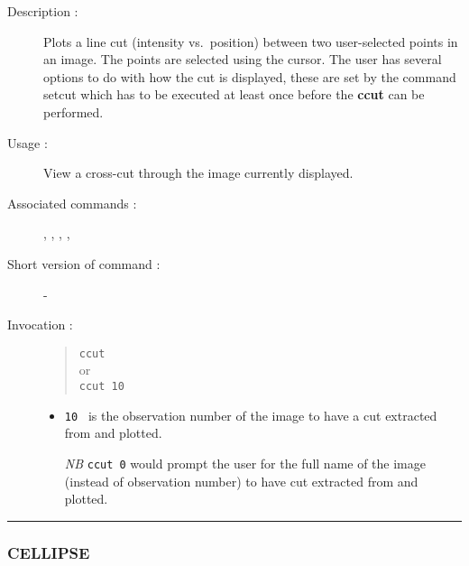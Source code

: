 \begin{description}

\item[Description :] Plots a line cut (intensity vs.\ position) between two
user-selected points in an image.  The points are selected using the
cursor.  The user has several options to do with how the cut is
displayed, these are set by the command setcut which has to be executed
at least once before the {\bf ccut} can be performed.

\item[Usage :] View a cross-cut through the image currently displayed.
\item[Associated commands :] {\tt {}},
{\tt {}}, {\tt {}},
{\tt {}}, {\tt {}}
\item[Short version of command :] -
\item[Invocation :]

\begin{quote}{\tt  ccut }\\
or \\
{\tt  ccut 10 }
\end{quote}

\begin{itemize}

\item {\tt 10 } is the observation number of the image to have a cut
extracted from and plotted.

\emph{NB} {\tt ccut 0}  would prompt the user for the full name of the image
(instead of observation number) to have cut extracted from and plotted.

\end{itemize}

\end{description}

\hrule
\subsubsection*{\label{CELLIPSE}CELLIPSE}

